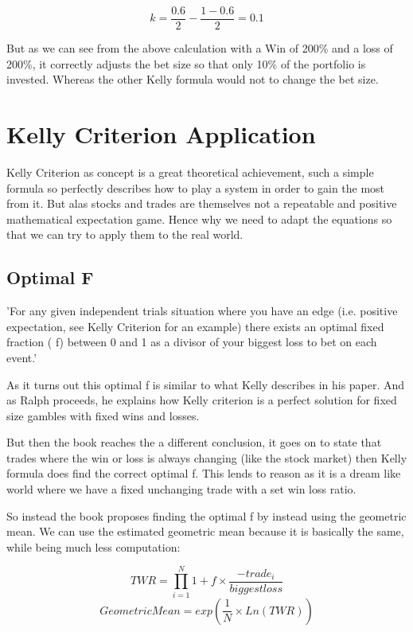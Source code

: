 \documentclass[12pt]{article}
\begin{document}
\[k = \frac{0.6}{2} - \frac{1 - 0.6}{2} = 0.1\]

But as we can see from the above calculation with a Win of 200\% and a loss of 200\%, it 
correctly adjusts the bet size so that only 10\% of the portfolio is invested. Whereas the 
other Kelly formula would not to change the bet size.

\section{Kelly Criterion Application}

Kelly Criterion as concept is a great theoretical achievement, such a simple formula so
perfectly describes how to play a system in order to gain the most from it. But alas
stocks and trades are themselves not a repeatable and positive mathematical expectation game.
Hence why we need to adapt the equations so that we can try to apply them to the real world.

\subsection{Optimal F}

\begin{displayquote}
    'For any given independent trials situation where you have an edge (i.e. positive 
    expectation, see Kelly Criterion for an example) there exists an optimal fixed fraction (
    f) between 0 and 1 as a divisor of your biggest loss to bet on each event.'\cite{Ralph}
\end{displayquote}

As it turns out this optimal f is similar to what Kelly describes in his paper. And as Ralph 
proceeds, he explains how Kelly criterion is a perfect solution for fixed size gambles with 
fixed wins and losses.

But then the book reaches the a different conclusion, it goes on to state that trades where 
the win or loss is always changing {(like the stock market)} then Kelly formula does find the 
correct optimal f. This lends to reason as it is a dream like world where we have a fixed 
unchanging trade with a set win loss ratio.

So instead the book proposes finding the optimal f by instead using the geometric mean. We 
can use the estimated geometric mean because it is basically the same, while being much less 
computation:

\begin{equation}\label{eq:TWR}
    TWR = \displaystyle\prod^{N}_{i=1}1 + f \times \frac{- trade_i}{biggest loss}
\end{equation}
\begin{equation}\label{eq:GeoMean}
    Geometric Mean = exp(\frac{1}{N} \times Ln(TWR))
\end{equation}
\end{document}
